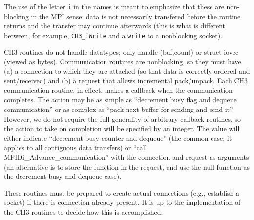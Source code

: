 \documentclass{article}
\def\code{\begingroup\makeustext\eatcode}
\def\eatcode#1{\texttt{#1}\endgroup}
\begin{document}
The use of the letter \code{i} in the names is meant to emphasize that these
are non-blocking in the MPI sense: data is not necessarily transfered before
the routine returns and the transfer may continue afterwards (this is what is
different between, for example, \code{CH3_iWrite} and a \code{write} to a
nonblocking socket).

CH3 routines do not handle datatypes; only handle (buf,count) or struct iovec
(viewed 
as bytes).  Communication routines are nonblocking, so they must have (a) a
connection to which they are attached (so that data is correctly ordered and
sent/received) and (b) a request that allows incremental
pack/unpack.  Each CH3 communication routine, in effect, makes a callback when
the communication completes.  The action may be as simple as ``decrement busy
flag and dequeue communication'' or as complex as ``pack next buffer for
sending and send it''.  However, we do not require the full generality of
arbitrary callback routines, so the action to take on completion will be
specified by an integer.  The value will either indicate ``decrement busy
counter and dequeue'' (the common case; it applies to all contiguous data
transfers) or ``call MPIDi\_Advance\_communication'' with the connection and
request as arguments (an alternative is to store the function in the request,
and use the null function as the decrement-busy-and-dequeue case).

These routines must be prepared to create actual connections (e.g., establish
a socket) if there is connection already present.  It is up to the
implementation of the CH3 routines to decide how this is accomplished.
\end{document}
